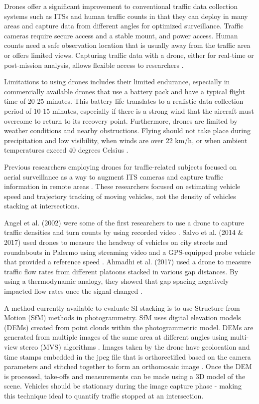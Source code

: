 \documentclass[preprint,12pt,a4paper]{elsarticle}
\begin{document}
\begin{linenumbers}
\begin{enumerate}
\end{enumerate}

Drones offer a significant improvement to conventional traffic data collection systems such as ITSs and human traffic counts in that they can deploy in many areas and capture data from different angles for optimized surveillance. Traffic cameras require secure access and a stable mount, and power access. Human counts need a safe observation location that is usually away from the traffic area or offers limited views. Capturing traffic data with a drone, either for real-time or post-mission analysis, allows flexible access to researchers \citep{Westoby2012}. 

Limitations to using drones includes their limited endurance, especially in commercially available drones that use a battery pack and have a typical flight time of 20-25 minutes. This battery life translates to a realistic data collection period of 10-15 minutes, especially if there is a strong wind that the aircraft must overcome to return to its recovery point. Furthermore, drones are limited by weather conditions and nearby obstructions. Flying should not take place during precipitation and low visibility, when winds are over 22 km/h, or when ambient temperatures exceed 40 degrees Celsius \citep{DJI2017}.

Previous researchers employing drones for traffic-related subjects focused on aerial surveillance as a way to augment ITS cameras and capture traffic information in remote areas \citep{Reinartz2006,  Liu2013, Barmpounakis2016, Barmpounakis2017}.  These researchers focused on estimating vehicle speed and trajectory tracking of moving vehicles, not the density of vehicles stacking at intersections.

Angel et al. (2002) were some of the first researchers to use a drone to capture traffic densities and turn counts by using recorded video \citep{Angel2002}. Salvo et al. (2014 \& 2017) used drones to measure the headway of vehicles on city streets and roundabouts in Palermo using streaming video and a GPS-equipped probe vehicle that provided a reference speed \citep{Salvo2014, Salvo2017}.  Ahmadhi et al. (2017) used a drone to measure traffic flow rates from different platoons stacked in various gap distances. By using a thermodynamic analogy, they showed that gap spacing negatively impacted flow rates once the signal changed \citep{Ahmadi2017}.

A method currently available to evaluate SI stacking is to use Structure from Motion (SfM) methods in photogrammetry. SfM uses digital elevation models (DEMs) created from point clouds within the photogrammetric model. DEMs are generated from multiple images of the same area at different angles using multi-view stereo (MVS) algorithms \citep{James2017}. Images taken by the drone have geolocation and time stamps embedded in the jpeg file that is orthorectified based on the camera parameters and stitched together to form an orthomosaic image \citep{Westoby2012}. Once the DEM is processed, take-offs and measurements can be made using a 3D model of the scene. Vehicles should be stationary during the image capture phase - making this technique ideal to quantify traffic stopped at an intersection.


\end{linenumbers}
\end{document}
